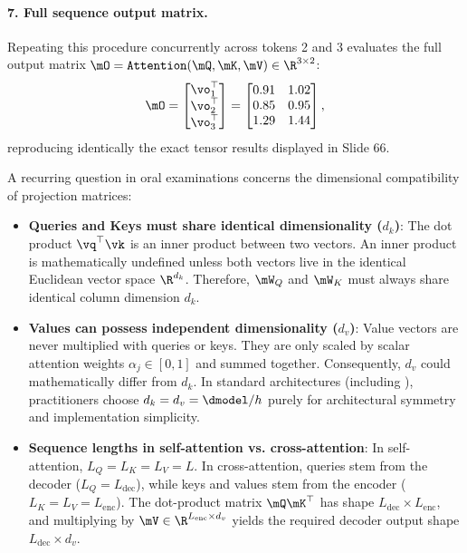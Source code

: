 \documentclass[../../main.tex]{subfiles}
\begin{document}
\begin{examinsight}
\paragraph{7. Full sequence output matrix.}
Repeating this procedure concurrently across tokens 2 and 3 evaluates the full output matrix $\mO = \text{\texttt{Attention}}(\mQ, \mK, \mV) \in \R^{3 \times 2}$:
\begin{equation}
\label{eq:full_output_matrix_lecture}
\mO = \begin{bmatrix}
\vo_1^\top \\
\vo_2^\top \\
\vo_3^\top
\end{bmatrix} = \begin{bmatrix}
0.91 & 1.02 \\
0.85 & 0.95 \\
1.29 & 1.44
\end{bmatrix},
\end{equation}
reproducing identically the exact tensor results displayed in Slide 66.
\end{examinsight}

\begin{examinsight}
A recurring question in oral examinations concerns the dimensional compatibility of projection matrices:
\begin{itemize}
    \item \textbf{Queries and Keys must share identical dimensionality ($d_k$)}: The dot product $\vq^\top \vk$ is an inner product between two vectors. An inner product is mathematically undefined unless both vectors live in the identical Euclidean vector space $\R^{d_k}$. Therefore, $\mW_Q$ and $\mW_K$ must always share identical column dimension $d_k$.
    \item \textbf{Values can possess independent dimensionality ($d_v$)}: Value vectors are never multiplied with queries or keys. They are only scaled by scalar attention weights $\alpha_j \in [0, 1]$ and summed together. Consequently, $d_v$ could mathematically differ from $d_k$. In standard architectures (including \cite{vaswani2017}), practitioners choose $d_k = d_v = \dmodel / h$ purely for architectural symmetry and implementation simplicity.
    \item \textbf{Sequence lengths in self-attention vs. cross-attention}: In self-attention, $L_Q = L_K = L_V = L$. In cross-attention, queries stem from the decoder ($L_Q = L_{\text{dec}}$), while keys and values stem from the encoder ($L_K = L_V = L_{\text{enc}}$). The dot-product matrix $\mQ \mK^\top$ has shape $L_{\text{dec}} \times L_{\text{enc}}$, and multiplying by $\mV \in \R^{L_{\text{enc}} \times d_v}$ yields the required decoder output shape $L_{\text{dec}} \times d_v$.
\end{itemize}
\end{examinsight}
\end{document}
